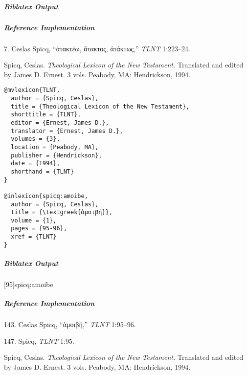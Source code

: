 \documentclass[a4paper]{article}
\newcommand{\textgreek}[1]{{\greekfont #1}}
\newenvironment{biboutput}{%
  \subparagraph{Biblatex Output}
}{\color{black}}
\newenvironment{refimp}{%
  \subparagraph{Reference Implementation}
  \color{reference-colour}
  \rm
}{\par\color{black}}
\begin{document}
\begin{biboutput}
\end{biboutput}

\begin{refimp}
  \hspace*{\bibindent}7. Ceslas Spicq, “\textgreek{ἀτακτέω, ἄτακτος, ἀτάκτως},”
  \emph{TLNT} 1:223–24.

  \hangindent\bibindent Spicq, Ceslas. \emph{Theological Lexicon of the New
  Testament.} Translated and edited by James D. Ernest. 3 vols. Peabody, MA:
  Hendrickson, 1994.

\end{refimp}

\medskip

\begin{lstlisting}
@mvlexicon{TLNT,
  author = {Spicq, Ceslas},
  title = {Theological Lexicon of the New Testament},
  shorttitle = {TLNT},
  editor = {Ernest, James D.},
  translator = {Ernest, James D.},
  volumes = {3},
  location = {Peabody, MA},
  publisher = {Hendrickson},
  date = {1994},
  shorthand = {TLNT}
}

@inlexicon{spicq:amoibe,
  author = {Spicq, Ceslas},
  title = {\textgreek{ἀμοιβή}},
  volume = {1},
  pages = {95-96},
  xref = {TLNT}
}
\end{lstlisting}

\begin{biboutput}
  [95]{spicq:amoibe}
\end{biboutput}

\begin{refimp}
  143. Ceslas Spicq, “\textgreek{ἀμοιβή},” \emph{TLNT} 1:95–96.

  147. Spicq, \emph{TLNT} 1:95.

  \hangindent\bibindent Spicq, Ceslas. \emph{Theological Lexicon of the New
  Testament.} Translated and edited by James D. Ernest. 3 vols. Peabody, MA:
  Hendrickson, 1994.

\end{refimp}
\end{document}
